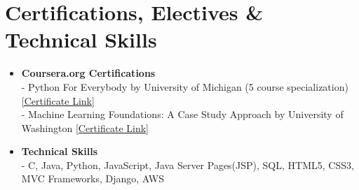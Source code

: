 \documentclass{article}
\begin{document}
\section*{Certifications, Electives \& Technical Skills}
\begin{itemize}
    \item \textbf{Coursera.org Certifications}\\
    - Python For Everybody by University of Michigan (5 course specialization) \href{https://www.coursera.org/account/accomplishments/specialization/2B5PCJGZ9WEE}{[Certificate Link]}\\
    - Machine Learning Foundations: A Case Study Approach by University of Washington \href{https://www.coursera.org/account/accomplishments/certificate/NDVXWMCYKX9N}{[Certificate Link]}
    
    \item \textbf{Technical Skills}\\
    - C, Java, Python, JavaScript, Java Server Pages(JSP), SQL, HTML5, CSS3, MVC Frameworks, Django, AWS
\end{itemize}
\end{document}
